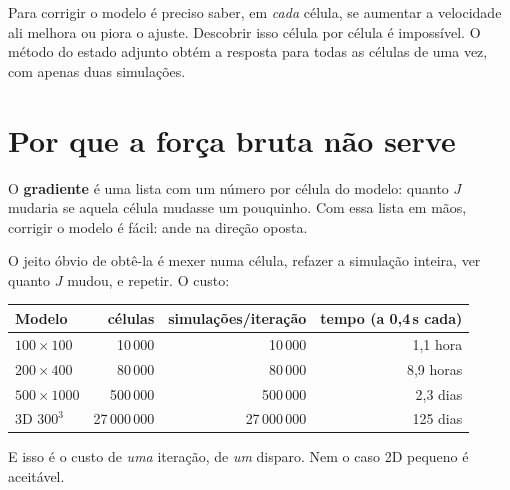 \documentclass[11pt,a4paper,oneside]{report}
\begin{document}
\begin{ideia}
Para corrigir o modelo \'e preciso saber, em \emph{cada} c\'elula, se
aumentar a velocidade ali melhora ou piora o ajuste. Descobrir isso c\'elula
por c\'elula \'e imposs\'ivel. O m\'etodo do estado adjunto obt\'em a resposta
para todas as c\'elulas de uma vez, com apenas duas simula\c{c}\~oes.
\end{ideia}

\section{Por que a for\c{c}a bruta n\~ao serve}

O \textbf{gradiente} \'e uma lista com um n\'umero por c\'elula do modelo:
quanto $J$ mudaria se aquela c\'elula mudasse um pouquinho. Com essa lista em
m\~aos, corrigir o modelo \'e f\'acil: ande na dire\c{c}\~ao oposta.

O jeito \'obvio de obt\^e-la \'e mexer numa c\'elula, refazer a
simula\c{c}\~ao inteira, ver quanto $J$ mudou, e repetir. O custo:

\begin{center}
\begin{tabular}{@{}lrrr@{}}
\toprule
\textbf{Modelo} & \textbf{c\'elulas} & \textbf{simula\c{c}\~oes/itera\c{c}\~ao}
& \textbf{tempo (a 0{,}4\,s cada)} \\
\midrule
$100\times100$  & 10\,000      & 10\,000      & 1{,}1 hora \\
$200\times400$  & 80\,000      & 80\,000      & 8{,}9 horas \\
$500\times1000$ & 500\,000     & 500\,000     & 2{,}3 dias \\
3D $300^{3}$    & 27\,000\,000 & 27\,000\,000 & 125 dias \\
\bottomrule
\end{tabular}
\end{center}

E isso \'e o custo de \emph{uma} itera\c{c}\~ao, de \emph{um} disparo. Nem o
caso 2D pequeno \'e aceit\'avel.
\end{document}
